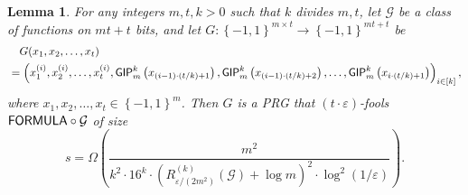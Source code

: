 \documentclass[10pt,a4paper]{article}
\newtheorem{lemma}[theorem]{Lemma}
\newcommand{\boolpm}{\left\{-1,1\right\}}
\newcommand{\FORMULA}{{\sf FORMULA}}
\newcommand{\GIP}{{\sf GIP}}
\begin{document}
	\begin{lemma}\label{lem:mild-prg}
	    For any integers $m,t,k>0$ such that $k$ divides $m,t$, let $\mathcal{G}$ be a class of functions on $mt+t$ bits, and let $G\colon\boolpm^{m\times t}\to\boolpm^{mt+t}$ be
		\begin{align*}
			&\quad G(x_1,x_2,\dots,x_t) \\
			&=\left(x_1^{(i)},x_2^{(i)},\dots,x_t^{(i)},\GIP_{m}^{k}\left(x_{(i-1)\cdot(t/k)+1}\right),\GIP_{m}^{k}\left(x_{(i-1)\cdot(t/k)+2}\right),\dots, \GIP_{m}^{k}\left(x_{i\cdot(t/k)+1}\right)\right)_{i\in[k]},
		\end{align*}
		where $x_1,x_2,\dots,x_t\in\boolpm^m$.
		Then $G$ is a PRG that $(t\cdot \varepsilon)$-fools $\FORMULA \circ \mathcal{G}$ of size 
		\[
			s=\Omega\left( \frac{m^2}{k^2\cdot16^{k}\cdot\left(R^{(k)}_{\varepsilon/(2m^2)}(\mathcal{G})+\log m\right)^2\cdot\log^2(1/\varepsilon)}\right).
		\]
	\end{lemma}
	
\end{document}
